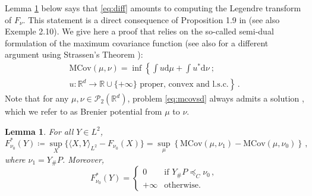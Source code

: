 \documentclass[12pt]{amsart}
\numberwithin{equation}{section}
\let\mc=\mathcal
\let\mr=\mathrm
\def\ed{\mathrm{d}}
\theoremstyle{plain}
\newtheorem{lemma}[theorem]{Lemma}
\theoremstyle{definition}
\begin{document}
Lemma \ref{lem:Fstar} below says that \eqref{eq:diff} amounts to computing the Legendre transform of $F_\nu$. This statement is a direct consequence of Proposition 1.9 in \cite{beiglbock2025brenier} (see also Exemple 2.10). We give here a proof that relies on the so-called semi-dual formulation of the maximum covariance function (see also \cite{bourne2026semidiscrete} for a different argument using Strassen's Theorem \cite{strassen1965existence}): 
\begin{multline}\label{eq:mcovsd}
\mr{MCov}(\mu,\nu) = \inf\left\{ \int u \ed \mu + \int u^* \ed \nu ~ ;~ \right. \\ \left. u:\mathbb{R}^d\rightarrow \mathbb{R}\cup\{+\infty\}  \text{ proper, convex and l.s.c.} \right \}\,.
\end{multline}
Note that for any $\mu,\nu \in \mc{P}_2(\mathbb{R}^d)$, problem \eqref{eq:mcovsd} always admits a solution \cite{villani2009optimal}, which we refer to as Brenier potential from $\mu$ to $\nu$. 

\begin{lemma}\label{lem:Fstar} For all $Y \in L^2$,
\begin{equation}\label{eq:Fstar}
F_{\nu_0}^*(Y) \coloneqq \sup_X  \{ \langle X,Y\rangle_{L^2} - F_{\nu_0}(X)\} = \sup_\mu \left\{\mr{MCov}(\mu,\nu_1) -\mr{MCov}(\mu,\nu_0) \right\}\,,
\end{equation}
where $\nu_1 = Y_\# P$. Moreover,
\begin{equation}\label{eq:Fnu0star}
F^*_{\nu_0}(Y) = \left\{ \begin{array}{ll} 0 & \text{if } Y_\# P \preceq_C \nu_0\,,\\
+\infty & \text{otherwise.} 
\end{array}\right.
\end{equation}
\end{lemma}
\end{document}
